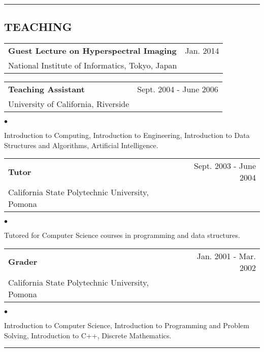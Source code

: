 \documentclass[letterpaper,10pt]{article}
\newcommand{\myline}{ \rule{\textwidth}{0.01in} }
\newenvironment{smallitemize}{
  \begin{list}{$\bullet$}{
    \setlength{\leftmargin}{3.5em}
        \setlength{\topmargin}{-1.0em}
    \setlength{\itemsep}{-0.10em}
    \setlength{\parskip}{-0.8em}
    \setlength{\parsep}{0.10em}
  }
}{
  \end{list}
}
\renewcommand{\bf}{\bfseries}
\begin{document}
\myline
\subsection*{TEACHING}
\begin{tabularx}{\textwidth}{b{}r}
        \bf{Guest Lecture on Hyperspectral Imaging} & Jan. 2014\\
        {National Institute of Informatics, Tokyo, Japan} &\\
\end{tabularx}

\begin{tabularx}{\textwidth}{b{}r}
        \bf{Teaching Assistant} & Sept. 2004 - June 2006\\
        {University of California, Riverside} &\\
\end{tabularx}
\begin{smallitemize} \normalfont
        \item Introduction to Computing, Introduction to Engineering, Introduction to Data Structures and Algorithms, Artificial Intelligence.
\end{smallitemize}

\begin{tabularx}{\textwidth}{b{}r}
        \bf{Tutor} & Sept. 2003 - June 2004\\
        {California State Polytechnic University, Pomona} &\\
\end{tabularx}
\begin{smallitemize} \normalfont
        \item Tutored for Computer Science courses in programming and data structures.
\end{smallitemize}
\begin{tabularx}{\textwidth}{b{}r}
        \bf{Grader} & Jan. 2001 - Mar. 2002\\
        {California State Polytechnic University, Pomona} &\\
\end{tabularx}
\begin{smallitemize} \normalfont
        \item Introduction to Computer Science, Introduction to Programming and Problem Solving, Introduction to C++, Discrete Mathematics.
\end{smallitemize}
\myline
\end{document}
